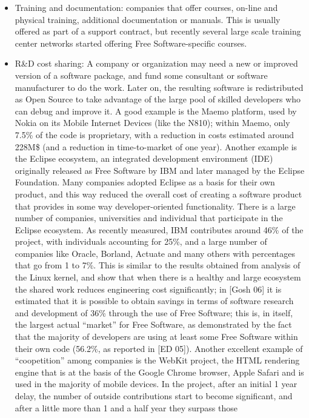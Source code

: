 \begin{itemize}
 \item Training and documentation: companies that offer courses, on-line and
physical training, additional documentation or manuals. This is usually offered
as part of a support contract, but recently several large scale training center
networks started offering Free Software-specific courses.
 \item R\&D cost sharing: A company or organization may need a new or improved
version of a software package, and fund some consultant or software manufacturer
to do the work. Later on, the resulting software is redistributed as Open Source
to take advantage of the large pool of skilled developers who can debug and
improve it. A good example is the Maemo platform, used by Nokia on its Mobile
Internet Devices (like the N810); within Maemo, only 7.5\% of the code is
proprietary, with a reduction in costs estimated around 228M\$ (and a reduction in
time-to-market of one year). Another example is the Eclipse ecosystem, an
integrated development environment (IDE) originally released as Free Software by
IBM and later managed by the Eclipse Foundation. Many companies adopted Eclipse
as a basis for their own product, and this way reduced the overall cost of
creating a software product that provides in some way developer-oriented
functionality. There is a large number of companies, universities and individual
that participate in the Eclipse ecosystem. As
recently measured, IBM contributes around 46\% of the project, with
individuals accounting for 25\%, and a large number of companies like Oracle,
Borland, Actuate and many others with percentages that go from 1 to 7\%. This is
similar to the results obtained from analysis of the Linux kernel, and show that
when there is a healthy and large ecosystem the shared work reduces engineering
cost significantly; in [Gosh 06] it is estimated that it is possible to obtain
savings in terms of software research and development of 36\% through the use of
Free Software; this is, in itself, the largest actual ``market'' for Free
Software, as demonstrated by the fact that the majority of developers are using
at least some Free Software within their own code (56.2\%, as reported in [ED
05]). Another excellent example of ``coopetition'' among companies is the WebKit
project, the HTML rendering engine that is at the basis of the Google Chrome
browser, Apple Safari and is used in the majority of mobile devices. In the project,
after an initial 1 year delay, the number of outside contributions start to become
significant, and after a little more than 1 and a half year they surpass those

\end{itemize}
